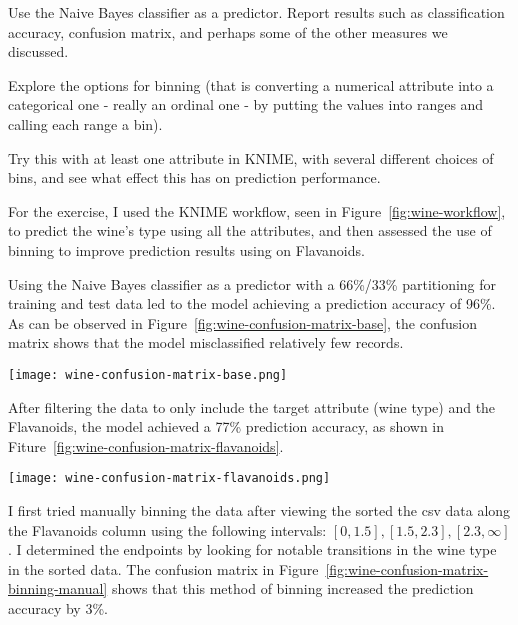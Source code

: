\documentclass[
  coursecode={CISC/CMPE 251},
  assignmentname={Exercise 2},
  studentnumber=20053722,
  name={Bryan Hoang}
]{
  ltxanswer%
}
\begin{document}
  \begin{questions}
    \question[2]{}
    Use the Naive Bayes classifier as a predictor. Report results such as classification accuracy, confusion matrix, and perhaps some of the other measures we discussed.

    Explore the options for binning (that is converting a numerical attribute into a categorical one - really an ordinal one - by putting the values into ranges and calling each range a bin).

    Try this with at least one attribute in KNIME, with several different choices of bins, and see what effect this has on prediction performance.
    \begin{solution}
      For the exercise, I used the KNIME workflow, seen in Figure~\ref{fig:wine-workflow}, to predict the wine's type using all the attributes, and then assessed the use of binning to improve prediction results using on Flavanoids.

      Using the Naive Bayes classifier as a predictor with a 66\%/33\% partitioning for training and test data led to the model achieving a prediction accuracy of \textapprox{}96\%. As can be observed in Figure~\ref{fig:wine-confusion-matrix-base}, the confusion matrix shows that the model misclassified relatively few records.

      \begin{answerfigure}
        \texttt{[image: wine-confusion-matrix-base.png]}
        \label{fig:wine-confusion-matrix-base}
      \end{answerfigure}

      After filtering the data to only include the target attribute (wine type) and the Flavanoids, the model achieved a \textapprox{}77\% prediction accuracy, as shown in Fiture~\ref{fig:wine-confusion-matrix-flavanoids}.

      \begin{answerfigure}
        \texttt{[image: wine-confusion-matrix-flavanoids.png]}
        \label{fig:wine-confusion-matrix-flavanoids}
      \end{answerfigure}

      \newpage

      I first tried manually binning the data after viewing the sorted the csv data along the Flavanoids column using the following intervals: \([0, 1.5], [1.5, 2.3], [2.3, \infty]\). I determined the endpoints  by looking for notable transitions in the wine type in the sorted data. The confusion matrix in Figure~\ref{fig:wine-confusion-matrix-binning-manual} shows that this method of binning increased the prediction accuracy by \textapprox{}3\%.


\end{solution}
\end{questions}
\end{document}
